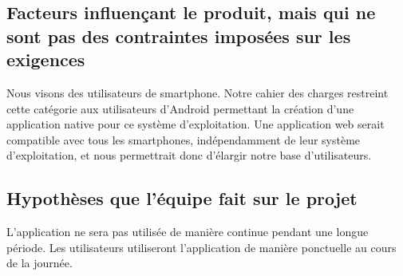 \subsection{Facteurs influençant le produit, mais qui ne sont pas des contraintes imposées sur les exigences} %
\label{sub:facteurs_influen_ant_le_produit_mais_qui_ne_sont_pas_des_contraintes_impos_es_sur_les_exigences}

	Nous visons des utilisateurs de smartphone. Notre cahier des charges restreint cette catégorie aux utilisateurs d'Android permettant la création d'une application native pour ce système d'exploitation. Une application web serait compatible avec tous les smartphones, indépendamment de leur système d'exploitation, et nous permettrait donc d'élargir notre base d'utilisateurs.


\subsection{Hypothèses que l’équipe fait sur le projet} %
\label{sub:hypoth_ses_que_l_quipe_fait_sur_le_projet}

	L'application ne sera pas utilisée de manière continue pendant une longue période. Les utilisateurs utiliseront l'application de manière ponctuelle au cours de la journée.

